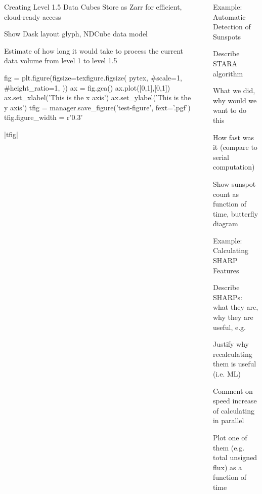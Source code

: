 \documentclass[final,12pt]{beamer}
\newlength{\sepwidth}
\newlength{\colwidth}
\newcommand{\separatorcolumn}{\begin{column}{\sepwidth}\end{column}}
\begin{document}
\begin{frame}[fragile,t]
\begin{columns}[t]
\begin{column}{\colwidth}
\begin{block}{Creating Level 1.5 Data Cubes}
    Store as Zarr for efficient, cloud-ready access

    Show Dask layout glyph, NDCube data model

    Estimate of how long it would take to process the current data volume from level 1 to level 1.5

    \begin{pycode}[manager]
fig = plt.figure(figsize=texfigure.figsize(
  pytex,
  #scale=1,
  #height_ratio=1,
))
ax = fig.gca()
ax.plot([0,1],[0,1])
ax.set_xlabel('This is the x axis')
ax.set_ylabel('This is the y axis')
tfig = manager.save_figure('test-figure', fext='.pgf')
tfig.figure_width = r'0.3\columnwidth'
    \end{pycode}
    \py[manager]|tfig|

  \end{block}

  
  

\end{column}

\separatorcolumn

\begin{column}{\colwidth}

  \begin{block}{Example: Automatic Detection of Sunspots}

    Describe STARA algorithm \citet{watson_modelling_2009}

    What we did, why would we want to do this

    How fast was it (compare to serial computation)

    Show sunspot count as function of time, butterfly diagram

  \end{block}

  \begin{block}{Example: Calculating SHARP Features}

    Describe SHARPs: what they are, why they are useful, e.g. \citet{bobra_helioseismic_2014}

    Justify why recalculating them is useful (i.e. ML)

    Comment on speed increase of calculating in parallel

    Plot one of them (e.g. total unsigned flux) as a function of time

  \end{block}


\end{column}
\end{columns}
\end{frame}
\end{document}
